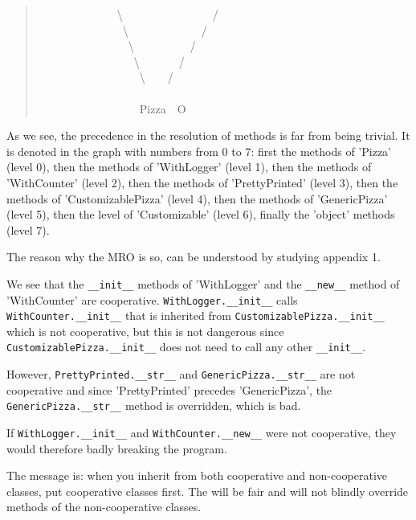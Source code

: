\documentclass[10pt,english]{article}
\begin{document}
\begin{quote}
\begin{ttfamily}
\begin{flushleft}
\mbox{~~~~~~~~~~~~~~{\textbackslash}~~~~~~~~~~~~~~~~/}\\
\mbox{~~~~~~~~~~~~~~~{\textbackslash}~~~~~~~~~~~~~/}\\
\mbox{~~~~~~~~~~~~~~~~{\textbackslash}~~~~~~~~~~/}\\
\mbox{~~~~~~~~~~~~~~~~~{\textbackslash}~~~~~~~/}\\
\mbox{~~~~~~~~~~~~~~~~~~{\textbackslash}~~~~/}\\
\mbox{}\\
\mbox{~~~~~~~~~~~~~~~~~~Pizza~~O}
\end{flushleft}\end{ttfamily}
\end{quote}

As we see, the precedence in the resolution of methods is far from being 
trivial. It is denoted in the graph with numbers
from 0 to 7: first the methods of 'Pizza' (level 0), then the methods of 
'WithLogger' (level 1), then the methods of 'WithCounter' (level 2),  then 
the methods of 'PrettyPrinted' (level 3), then the methods of
'CustomizablePizza' (level 4), then the methods of 'GenericPizza' (level 5),
then the level of 'Customizable' (level 6), finally the 'object' methods 
(level 7).

The reason why the MRO is so, can be understood by studying 
appendix 1.

We see that the \texttt{{\_}{\_}init{\_}{\_}} methods of 'WithLogger' and 
the \texttt{{\_}{\_}new{\_}{\_}} method of 'WithCounter' are cooperative. 
\texttt{WithLogger.{\_}{\_}init{\_}{\_}} 
calls \texttt{WithCounter.{\_}{\_}init{\_}{\_}} that is
inherited from \texttt{CustomizablePizza.{\_}{\_}init{\_}{\_}} which is not cooperative, 
but this is not dangerous since \texttt{CustomizablePizza.{\_}{\_}init{\_}{\_}} does not need 
to call any other \texttt{{\_}{\_}init{\_}{\_}}.

However, \texttt{PrettyPrinted.{\_}{\_}str{\_}{\_}} and \texttt{GenericPizza.{\_}{\_}str{\_}{\_}} are not
cooperative and since 'PrettyPrinted' precedes 'GenericPizza', the
\texttt{GenericPizza.{\_}{\_}str{\_}{\_}} method is overridden, which is bad.

If  \texttt{WithLogger.{\_}{\_}init{\_}{\_}}  and \texttt{WithCounter.{\_}{\_}new{\_}{\_}} were not 
cooperative, they would therefore badly breaking the program.

The message is: when you inherit from both cooperative and non-cooperative
classes, put cooperative classes first. The will be fair and will not
blindly override methods of the non-cooperative classes.
\end{document}
